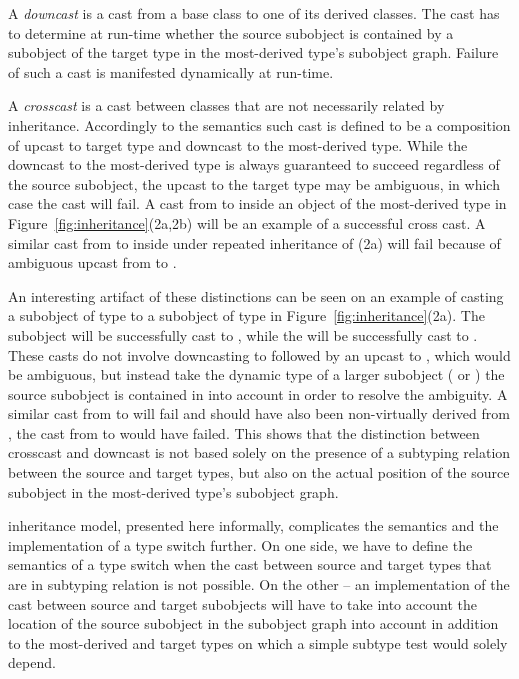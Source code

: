 A \emph{downcast} is a cast from a base class to one of its derived classes. The 
cast has to determine at run-time whether the source subobject is contained by a 
subobject of the target type in the most-derived type's subobject graph. Failure 
of such a cast is manifested dynamically at run-time.

A \emph{crosscast} is a cast between classes that are not necessarily related by 
inheritance. Accordingly to the \Cpp{} semantics such cast is defined to be a 
composition of upcast to target type and downcast to the most-derived type. 
While the downcast to the most-derived type is always guaranteed to succeed 
regardless of the source subobject, the upcast to the target type may be 
ambiguous, in which case the cast will fail. A cast from  to  
inside an object of the most-derived type  in 
Figure~\ref{fig:inheritance}(2a,2b) will be an example of a successful cross 
cast. A similar cast from  to  inside  under repeated 
inheritance of (2a) will fail because of ambiguous upcast from  to 
.

An interesting artifact of these distinctions can be seen on an example of 
casting a subobject of type  to a subobject of type  in 
Figure~\ref{fig:inheritance}(2a). The subobject  will be 
successfully cast to , while the  will be 
successfully cast to . These casts do not involve downcasting to 
 followed by an upcast to , which would be ambiguous, but 
instead take the dynamic type of a larger subobject ( or ) 
the source subobject is contained in into account in order to resolve the 
ambiguity. A similar cast from  to  will fail and should 
 have also been non-virtually derived from , the cast from 
 to  would have failed. This shows that the distinction 
between crosscast and downcast is not based solely on the presence of a 
subtyping relation between the source and target types, but also on the actual 
position of the source subobject in the most-derived type's subobject graph.

\Cpp{} inheritance model, presented here informally, complicates the semantics and 
the implementation of a type switch further. On one side, we have to define the 
semantics of a type switch when the cast between source and target types that 
are in subtyping relation is not possible. On the other -- an implementation of 
the cast between source and target subobjects will have to take into account the 
location of the source subobject in the subobject graph into account in addition 
to the most-derived and target types on which a simple subtype test would solely 
depend.

